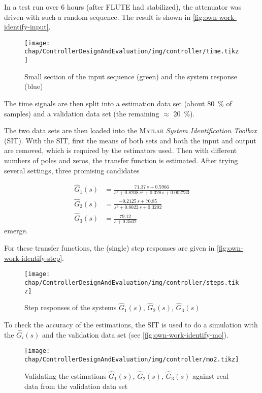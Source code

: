 In a test run over 6 hours (after FLUTE had stabilized), the attenuator was driven with such a random sequence. The result is shown in \autoref{fig:own-work-identify-input}.

\begin{figure}[tb]
	\centering
	\texttt{[image: chap/ControllerDesignAndEvaluation/img/controller/time.tikz]}
	\caption{Small section of the input sequence (green) and the system response (blue)}
	\label{fig:own-work-identify-input}
\end{figure}

The time signals are then split into a estimation data set (about \SI{80}{\percent} of samples) and a validation data set (the remaining $\approx$ \SI{20}{\percent}).

The two data sets are then loaded into the \textsc{Matlab} \textit{System Identification Toolbox} (SIT). With the SIT, first the means of both sets and both the input and output are removed, which is required by the estimators used. Then with different numbers of poles and zeros, the transfer function is estimated. After trying several settings, three promising candidates

\begin{align}
\hat{G}_1(s) &= \frac{71.37\,s + 0.5966}{s^3 + 0.8208\,s^2 + 0.328\,s + 0.002733} \\[1em]
\hat{G}_2(s) &= \frac{-0.2125\,s + 70.85}{s^2 + 0.8022\,s + 0.3202} \\[1em]
\hat{G}_3(s) &= \frac{79.12}{s + 0.3502}
\end{align}
emerge.

For these transfer functions, the (single) step responses are given in \autoref{fig:own-work-identify-step}.

\begin{figure}[tb]
	\centering
	\texttt{[image: chap/ControllerDesignAndEvaluation/img/controller/steps.tikz]}
	\caption{Step responses of the systems $\hat{G}_1(s)$, $\hat{G}_2(s)$, $\hat{G}_3(s)$}
	\label{fig:own-work-identify-step}
\end{figure}

To check the accuracy of the estimations, the SIT is used to do a simulation with the $\hat{G}_i(s)$ and the validation data set (see \autoref{fig:own-work-identify-mo}).

\begin{figure}[tb]
	\centering
	\texttt{[image: chap/ControllerDesignAndEvaluation/img/controller/mo2.tikz]}
	\caption{Validating the estimations $\hat{G}_1(s)$, $\hat{G}_2(s)$, $\hat{G}_3(s)$ against real data from the validation data set}
	\label{fig:own-work-identify-mo}
\end{figure}

